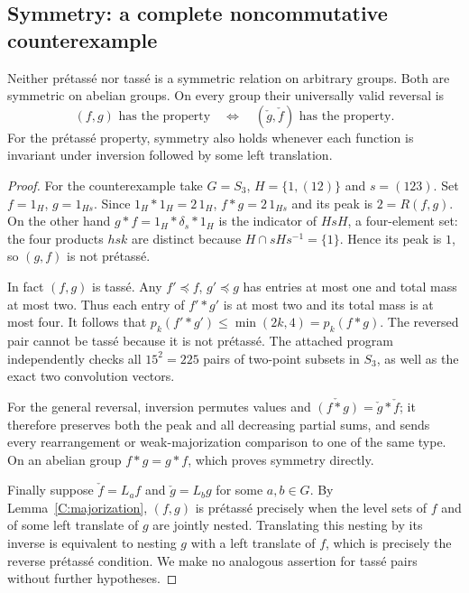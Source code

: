 \subsection{Symmetry: a complete noncommutative counterexample}
\begin{theorem}
\label{C:symmetry}
Neither pr\'etass\'e nor tass\'e is a symmetric relation on arbitrary groups. Both are symmetric on abelian groups. On every group their universally valid reversal is
\[
(f,g)\text{ has the property}
\quad\Longleftrightarrow\quad
(\check g,\check f)\text{ has the property}.
\]
For the pr\'etass\'e property, symmetry also holds whenever each function is invariant under inversion followed by some left translation.
\end{theorem}
\begin{proof}
For the counterexample take $G=S_3$, $H=\{1,(12)\}$ and $s=(123)$. Set $f=1_H$, $g=1_{Hs}$. Since $1_H*1_H=2\,1_H$,
$f*g=2\,1_{Hs}$ and its peak is $2=R(f,g)$. On the other hand
$g*f=1_H*\delta_s*1_H$ is the indicator of $HsH$, a four-element set: the four products $hsk$ are distinct because $H\cap sHs^{-1}=\{1\}$. Hence its peak is $1$, so $(g,f)$ is not pr\'etass\'e.

In fact $(f,g)$ is tass\'e. Any $f'\preceq f$, $g'\preceq g$ has entries at most one and total mass at most two. Thus each entry of $f'*g'$ is at most two and its total mass is at most four. It follows that
$p_k(f'*g')\leq\min(2k,4)=p_k(f*g)$.
The reversed pair cannot be tass\'e because it is not pr\'etass\'e. The attached program independently checks all $15^2=225$ pairs of two-point subsets in $S_3$, as well as the exact two convolution vectors.

For the general reversal, inversion permutes values and
$\check{(f*g)}=\check g*\check f$; it therefore preserves both the peak and all decreasing partial sums, and sends every rearrangement or weak-majorization comparison to one of the same type. On an abelian group $f*g=g*f$, which proves symmetry directly.

Finally suppose $\check f=L_a f$ and $\check g=L_b g$ for some $a,b\in G$. By Lemma~\ref{C:majorization}, $(f,g)$ is pr\'etass\'e precisely when the level sets of $f$ and of some left translate of $g$ are jointly nested. Translating this nesting by its inverse is equivalent to nesting $g$ with a left translate of $f$, which is precisely the reverse pr\'etass\'e condition. We make no analogous assertion for tass\'e pairs without further hypotheses.
\end{proof}


